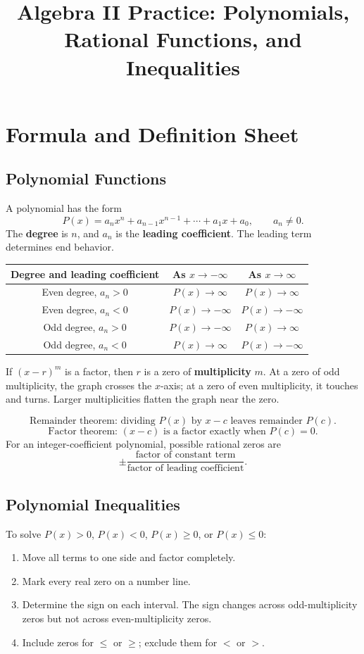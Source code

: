 \documentclass[12pt]{article}
\title{Algebra II Practice: Polynomials, Rational Functions, and Inequalities}
\author{}
\date{}
\begin{document}
\maketitle

\section*{Formula and Definition Sheet}

\subsection*{Polynomial Functions}
A polynomial has the form
\[
  P(x)=a_nx^n+a_{n-1}x^{n-1}+\cdots+a_1x+a_0,
  \qquad a_n\ne0.
\]
The \textbf{degree} is $n$, and $a_n$ is the \textbf{leading coefficient}. The leading term determines end behavior.

\begin{center}
\begin{tabular}{c|c|c}
Degree and leading coefficient & As $x\to-\infty$ & As $x\to\infty$\\ \hline
Even degree, $a_n>0$ & $P(x)\to\infty$ & $P(x)\to\infty$\\
Even degree, $a_n<0$ & $P(x)\to-\infty$ & $P(x)\to-\infty$\\
Odd degree, $a_n>0$ & $P(x)\to-\infty$ & $P(x)\to\infty$\\
Odd degree, $a_n<0$ & $P(x)\to\infty$ & $P(x)\to-\infty$
\end{tabular}
\end{center}

If $(x-r)^m$ is a factor, then $r$ is a zero of \textbf{multiplicity} $m$. At a zero of odd multiplicity, the graph crosses the $x$-axis; at a zero of even multiplicity, it touches and turns. Larger multiplicities flatten the graph near the zero.

\[
  \text{Remainder theorem: dividing $P(x)$ by $x-c$ leaves remainder $P(c)$.}
\]
\[
  \text{Factor theorem: $(x-c)$ is a factor exactly when $P(c)=0$.}
\]
For an integer-coefficient polynomial, possible rational zeros are
\[
  \pm\frac{\text{factor of constant term}}{\text{factor of leading coefficient}}.
\]

\subsection*{Polynomial Inequalities}
To solve $P(x)>0$, $P(x)<0$, $P(x)\ge0$, or $P(x)\le0$:
\begin{enumerate}[leftmargin=1.6em,itemsep=0.15em]
  \item Move all terms to one side and factor completely.
  \item Mark every real zero on a number line.
  \item Determine the sign on each interval. The sign changes across odd-multiplicity zeros but not across even-multiplicity zeros.
  \item Include zeros for $\le$ or $\ge$; exclude them for $<$ or $>$.
\end{enumerate}
\end{document}
